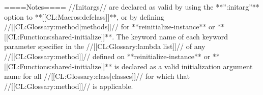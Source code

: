 ====Notes====
//Initargs// are declared as valid by using the **'':initarg''** option to **[[CL:Macros:defclass]]**, or by defining //[[CL:Glossary:method|methods]]// for **reinitialize-instance** or **[[CL:Functions:shared-initialize]]**. The keyword name of each keyword parameter specifier in the //[[CL:Glossary:lambda list]]// of any //[[CL:Glossary:method]]// defined on **reinitialize-instance** or **[[CL:Functions:shared-initialize]]** is declared as a valid initialization argument name for all //[[CL:Glossary:class|classes]]// for which that //[[CL:Glossary:method]]// is applicable.

